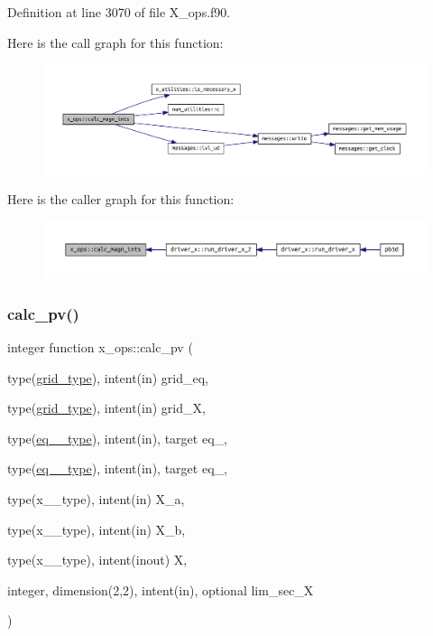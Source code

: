 Definition at line 3070 of file X\+\_\+ops.\+f90.

Here is the call graph for this function\+:\nopagebreak
\begin{figure}[H]
\begin{center}
\leavevmode
\includegraphics[width=350pt]{namespacex__ops_a6df79622d1b95d54ab3e542751a5881d_cgraph}
\end{center}
\end{figure}
Here is the caller graph for this function\+:\nopagebreak
\begin{figure}[H]
\begin{center}
\leavevmode
\includegraphics[width=350pt]{namespacex__ops_a6df79622d1b95d54ab3e542751a5881d_icgraph}
\end{center}
\end{figure}
\mbox{\label{namespacex__ops_a51f3bf0b4c8d688ffbcc3a1adbca9762}} 
\subsubsection{\texorpdfstring{calc\+\_\+pv()}{calc\_pv()}}
{\footnotesize\ttfamily integer function x\+\_\+ops\+::calc\+\_\+pv (\begin{DoxyParamCaption}\item[{type(\hyperlink{structgrid__vars_1_1grid__type}{grid\+\_\+type}), intent(in)}]{grid\+\_\+eq,  }\item[{type(\hyperlink{structgrid__vars_1_1grid__type}{grid\+\_\+type}), intent(in)}]{grid\+\_\+X,  }\item[{type(\hyperlink{structeq__vars_1_1eq__1__type}{eq\+\_\+1\+\_\+type}), intent(in), target}]{eq\+\_,  }\item[{type(\hyperlink{structeq__vars_1_1eq__2__type}{eq\+\_\+2\+\_\+type}), intent(in), target}]{eq\+\_,  }\item[{type(x\+\_\+1\+\_\+type), intent(in)}]{X\+\_\+a,  }\item[{type(x\+\_\+1\+\_\+type), intent(in)}]{X\+\_\+b,  }\item[{type(x\+\_\+2\+\_\+type), intent(inout)}]{X,  }\item[{integer, dimension(2,2), intent(in), optional}]{lim\+\_\+sec\+\_\+X }\end{DoxyParamCaption})}



